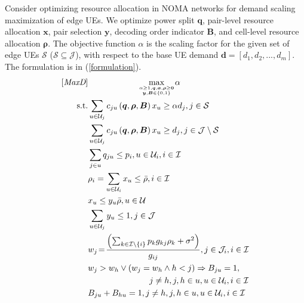 \documentclass[10pt,journal,final,finalsubmission,twocolumn]{IEEEtran}
\begin{document}
Consider optimizing resource allocation in NOMA networks for demand scaling maximization of edge UEs. We optimize power split $\boldsymbol{q}$, pair-level resource allocation $\boldsymbol{x}$, pair selection $\boldsymbol{y}$, decoding order indicator $\boldsymbol{B}$, and cell-level resource allocation $\boldsymbol{\rho}$. The objective function $\alpha$ is the scaling factor for the given set of edge UEs $\mathcal{S}$ ($\mathcal{S}\subseteq \mathcal{J}$), with respect to the base UE demand $\boldsymbol{d}=[d_1,d_2,...,d_m]$. The formulation is in (\ref {formulation}).
\begin{subequations}\label{formulation}
\begin{align}
\textup{[{\em MaxD}]}&\ \ \ \ \ \ \ \ \ \ \ \ \ \ \ \ \ \ \underset{\alpha \geq 1,\boldsymbol{q},\boldsymbol{x},\boldsymbol{\rho}\geq \boldsymbol{0} \atop \boldsymbol{y},\boldsymbol{B}\in \left \{ 0,1 \right \}}{\max} \alpha  \\
\textup{ s.t.}& \sum\limits_{u\in {\mathcal{U}}_j} c_{ju}\left (\boldsymbol{q},\boldsymbol{ \rho}, \boldsymbol{B}\right )x_u\geq \alpha d_j, j\in \mathcal{S}\label{demand1}\\ 
& \sum\limits_{u\in {\mathcal{U}}_j} c_{ju}\left (\boldsymbol{q},\boldsymbol{ \rho}, \boldsymbol{B}\right )x_u\geq  d_j, j\in \mathcal{J} \setminus  \mathcal{S}\label{demand2}\\ 
&\sum \limits_{j \in u} q_{ju}\leq p_i,u\in {\mathcal{U}}_i, i\in \mathcal{I}  \label{limit1}\\
&\rho _i =\sum \limits_{u\in {\mathcal{U}}_i}x_u\leq \bar{\rho}, i\in \mathcal{I} \label{limit2}\\
&x_u\leq y_u \bar{\rho}, u\in \mathcal{U}\label{y1}\\
&\sum\limits_{u\in \mathcal{U}_j}y_u\leq1,j\in\mathcal{J}\label{y2}\\
&w_j\!=\!  \frac{\left(\sum \nolimits_{k \in \mathcal{I}\setminus \left \{ i \right \} }p_k g_{kj}\rho_k+\sigma ^2   \right)}{ g_{ij}},j \in \mathcal{J}_i ,i\in \mathcal{I}\label{order0}\\
&w_j>w_h\vee(w_j=w_h\wedge h < j)\Rightarrow B_{ju}=1,\notag\\
&\ \ \ \ \ \ \ \ \ \ \ \ \ \ \ \ \ \ \ \ \ \ j\neq h,j,h\in u, u\in \mathcal{U}_i, i\in \mathcal{I}\label{order1}\\
&B_{ju}+B_{hu}=1, j\neq h, j,h\in u, u\in \mathcal{U}_i, i\in \mathcal{I}\label{order2}
\end{align}
\end{subequations}
\end{document}
